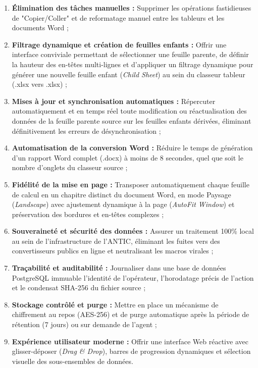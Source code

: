 \begin{enumerate}
    \item \textbf{Élimination des tâches manuelles :} Supprimer les opérations fastidieuses de "Copier/Coller" et de reformatage manuel entre les tableurs et les documents Word ;
    \item \textbf{Filtrage dynamique et création de feuilles enfants :} Offrir une interface conviviale permettant de sélectionner une feuille parente, de définir la hauteur des en-têtes multi-lignes et d'appliquer un filtrage dynamique pour générer une nouvelle feuille enfant (\textit{Child Sheet}) au sein du classeur tableur (.xlsx vers .xlsx) ;
    \item \textbf{Mises à jour et synchronisation automatiques :} Répercuter automatiquement et en temps réel toute modification ou réactualisation des données de la feuille parente source sur les feuilles enfants dérivées, éliminant définitivement les erreurs de désynchronisation ;
    \item \textbf{Automatisation de la conversion Word :} Réduire le temps de génération d'un rapport Word complet (.docx) à moins de 8 secondes, quel que soit le nombre d'onglets du classeur source ;
    \item \textbf{Fidélité de la mise en page :} Transposer automatiquement chaque feuille de calcul en un chapitre distinct du document Word, en mode Paysage (\textit{Landscape}) avec ajustement dynamique à la page (\textit{AutoFit Window}) et préservation des bordures et en-têtes complexes ;
    \item \textbf{Souveraineté et sécurité des données :} Assurer un traitement 100\% local au sein de l'infrastructure de l'ANTIC, éliminant les fuites vers des convertisseurs publics en ligne et neutralisant les macros virales ;
    \item \textbf{Traçabilité et auditabilité :} Journaliser dans une base de données PostgreSQL immuable l'identité de l'opérateur, l'horodatage précis de l'action et le condensat SHA-256 du fichier source ;
    \item \textbf{Stockage contrôlé et purge :} Mettre en place un mécanisme de chiffrement au repos (AES-256) et de purge automatique après la période de rétention (7 jours) ou sur demande de l'agent ;
    \item \textbf{Expérience utilisateur moderne :} Offrir une interface Web réactive avec glisser-déposer (\textit{Drag \& Drop}), barres de progression dynamiques et sélection visuelle des sous-ensembles de données.
\end{enumerate}

